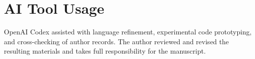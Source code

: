 \documentclass[conference,letterpaper,10pt]{IEEEtran}
\begin{document}
\section*{AI Tool Usage}
OpenAI Codex assisted with language refinement, experimental code prototyping, and cross-checking of author records. The author reviewed and revised the resulting materials and takes full responsibility for the manuscript.



\end{document}
